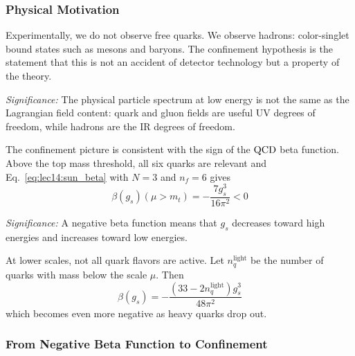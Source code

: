 \documentclass[../main.tex]{subfiles}
\begin{document}
\subsubsection*{Physical Motivation}

Experimentally, we do not observe free quarks. We observe hadrons: color-singlet bound states such as mesons and baryons. The confinement hypothesis is the statement that this is not an accident of detector technology but a property of the theory.


\textit{Significance:} The physical particle spectrum at low energy is not the same as the Lagrangian field content: quark and gluon fields are useful UV degrees of freedom, while hadrons are the IR degrees of freedom.

The confinement picture is consistent with the sign of the $\mathrm{QCD}$ beta function. Above the top mass threshold, all six quarks are relevant and Eq.~\eqref{eq:lec14:sun_beta} with $N=3$ and $n_f=6$ gives
\begin{equation}
  \boxed{\;\beta(g_s)(\mu>m_t)
  =-\frac{7g_s^3}{16\pi^2}<0\;}
  \label{eq:lec14:qcd_beta_above_top}
\end{equation}

\textit{Significance:} A negative beta function means that $g_s$ decreases toward high energies and increases toward low energies.

At lower scales, not all quark flavors are active. Let $n_q^{\mathrm{light}}$ be the number of quarks with mass below the scale $\mu$. Then
\begin{equation}
  \boxed{\;\beta(g_s)
  =-\frac{(33-2n_q^{\mathrm{light}})g_s^3}{48\pi^2}\;}
  \label{eq:lec14:qcd_beta_light}
\end{equation}
which becomes even more negative as heavy quarks drop out.

\subsubsection*{From Negative Beta Function to Confinement}
\end{document}
